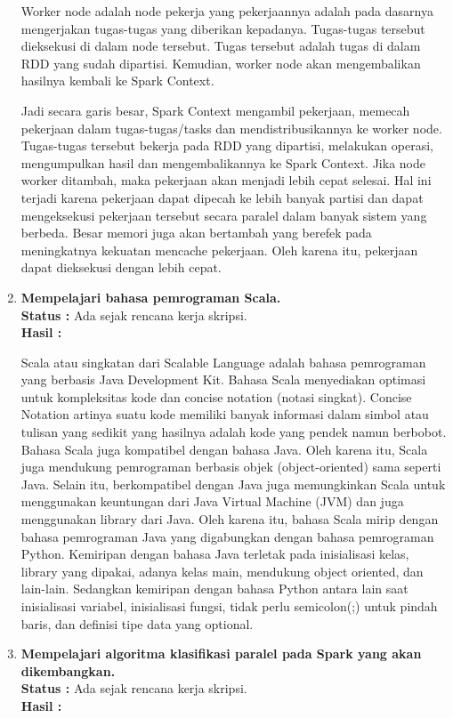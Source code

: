 \documentclass[a4paper,twoside]{article}
\begin{document}
\begin{enumerate}
Worker node adalah node pekerja yang pekerjaannya adalah pada dasarnya mengerjakan tugas-tugas yang diberikan kepadanya. Tugas-tugas tersebut dieksekusi di dalam node tersebut. Tugas tersebut adalah tugas di dalam RDD yang sudah dipartisi. Kemudian, worker node  akan mengembalikan hasilnya kembali ke Spark Context.

Jadi secara garis besar, Spark Context mengambil pekerjaan, memecah pekerjaan dalam tugas-tugas/tasks dan mendistribusikannya ke worker node. Tugas-tugas tersebut bekerja pada RDD yang dipartisi, melakukan operasi, mengumpulkan hasil dan mengembalikannya ke Spark Context. 
Jika node worker ditambah, maka pekerjaan akan menjadi lebih cepat selesai. Hal ini terjadi karena pekerjaan dapat dipecah ke lebih banyak partisi dan dapat mengeksekusi pekerjaan tersebut secara paralel dalam banyak sistem yang berbeda. Besar memori juga akan bertambah yang berefek pada meningkatnya kekuatan mencache pekerjaan. Oleh karena itu, pekerjaan dapat dieksekusi dengan lebih cepat.
		
		\item \textbf{Mempelajari bahasa pemrograman Scala.}\\
		{\bf Status :} Ada sejak rencana kerja skripsi.\\
		{\bf Hasil :} 
		
Scala atau singkatan dari Scalable Language adalah bahasa pemrograman yang berbasis Java Development Kit. Bahasa Scala menyediakan optimasi untuk kompleksitas kode dan concise notation (notasi singkat). Concise Notation artinya suatu kode memiliki banyak informasi dalam simbol atau tulisan yang sedikit yang hasilnya adalah kode yang pendek namun berbobot. Bahasa Scala juga kompatibel dengan bahasa Java. Oleh karena itu, Scala juga mendukung pemrograman berbasis objek (object-oriented) sama seperti Java. Selain itu, berkompatibel dengan Java juga memungkinkan Scala untuk menggunakan keuntungan dari Java Virtual Machine (JVM) dan juga menggunakan library dari Java. Oleh karena itu, bahasa Scala mirip dengan bahasa pemrograman Java yang digabungkan dengan bahasa pemrograman Python. Kemiripan dengan bahasa Java terletak pada inisialisasi kelas, library yang dipakai, adanya kelas main, mendukung object oriented, dan lain-lain. Sedangkan kemiripan dengan bahasa Python antara lain saat inisialisasi variabel, inisialisasi fungsi, tidak perlu semicolon(;) untuk pindah baris, dan definisi tipe data yang optional.
		\item \textbf{Mempelajari algoritma klasifikasi paralel pada Spark yang akan dikembangkan.}\\
		{\bf Status :} Ada sejak rencana kerja skripsi.\\
		{\bf Hasil :} 


\end{enumerate}
\end{document}

